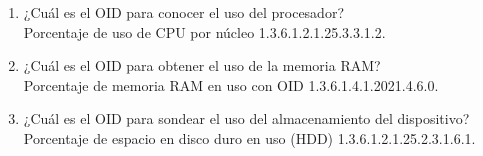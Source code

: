 \begin{enumerate}
\item ¿Cuál es el OID para conocer el uso del procesador?\\
Porcentaje de uso de CPU por núcleo 1.3.6.1.2.1.25.3.3.1.2.
\item ¿Cuál es el OID para obtener el uso de la memoria RAM?\\
Porcentaje de memoria RAM en uso con OID 1.3.6.1.4.1.2021.4.6.0.
\item ¿Cuál es el OID para sondear el uso del almacenamiento del dispositivo?\\
Porcentaje de espacio en disco duro en uso (HDD) 1.3.6.1.2.1.25.2.3.1.6.1.
\end{enumerate}
